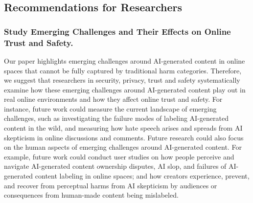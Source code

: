 \subsection{Recommendations for Researchers}
\subsubsection{Study Emerging Challenges and Their Effects on Online Trust and Safety.}
Our paper highlights emerging challenges around AI-generated content in online spaces that cannot be fully captured by traditional harm categories. Therefore, we suggest that researchers in security, privacy, trust and safety systematically examine how these emerging challenges around AI-generated content play out in real online environments and how they affect online trust and safety. For instance, future work could measure the current landscape of emerging challenges, such as investigating the failure modes of labeling AI-generated content in the wild, and measuring how hate speech arises and spreads from AI skepticism in online discussions and comments. Future research could also focus on the human aspects of emerging challenges around AI-generated content. For example, future work could conduct user studies on how people perceive and navigate AI-generated content ownership disputes, AI slop, and failures of AI-generated content labeling in online spaces; and how creators experience, prevent, and recover from perceptual harms from AI skepticism by audiences or consequences from human-made content being mislabeled. %


